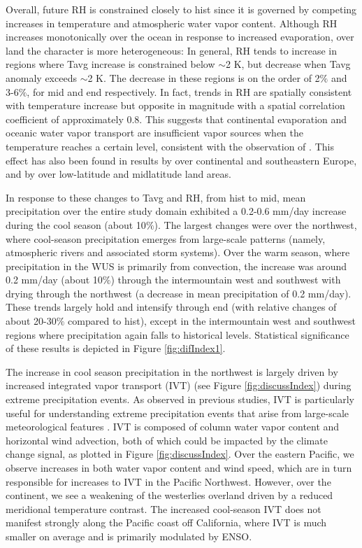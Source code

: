 \documentclass{ametsoc}
\begin{document}
Overall, future RH is constrained closely to {\textsf{hist}} since it is governed by competing increases in temperature and atmospheric water vapor content. Although RH increases monotonically over the ocean in response to increased evaporation, over land the character is more heterogeneous:  In general, RH tends to increase in regions where Tavg increase is constrained below $\sim$2 K, but decrease when Tavg anomaly exceeds $\sim$2 K. The decrease in these regions is on the order of 2$\%$ and 3-6$\%$, for \textsf{mid} and \textsf{end} respectively.  In fact, trends in RH are spatially consistent with temperature increase but opposite in magnitude with a spatial correlation coefficient of approximately 0.8. This suggests that continental evaporation and oceanic water vapor transport are insufficient vapor sources when the temperature reaches a certain level, consistent with the observation of \cite{joshi2008mechanisms}.  This effect has also been found in results by \cite{rowell2006causes} over continental and southeastern Europe, and by \cite{simmons2010low} over low-latitude and midlatitude land areas.


In response to these changes to Tavg and RH, from \textsf{hist} to \textsf{mid}, mean precipitation over the entire study domain exhibited a 0.2-0.6 mm/day increase during the cool season (about 10$\%$). The largest changes were over the northwest, where cool-season precipitation emerges from large-scale patterns (namely, atmospheric rivers and associated storm systems)\citep{trenberth2003changing, neiman2008meteorological}. Over the warm season, where precipitation in the WUS is primarily from convection, the increase was around 0.2 mm/day (about 10$\%$) through the intermountain west and southwest with drying through the northwest (a decrease in mean precipitation of 0.2 mm/day). These trends largely hold and intensify through \textsf{end} (with relative changes of about 20-30$\%$ compared to \textsf{hist}), except in the intermountain west and southwest regions where precipitation again falls to historical levels.  Statistical significance of these results is depicted in Figure \ref{fig:difIndex1}.


The increase in cool season precipitation in the northwest is largely driven by increased integrated vapor transport (IVT) (see Figure \ref{fig:discussIndex}) during extreme precipitation events.  As observed in previous studies, IVT is particularly useful for understanding extreme precipitation events that arise from large-scale meteorological features \citep{ralph2004satellite, leung2009atmospheric, dettinger2011climate}.  IVT is composed of column water vapor content and horizontal wind advection, both of which could be impacted by the climate change signal, as plotted in Figure \ref{fig:discussIndex}. Over the eastern Pacific, we observe increases in both water vapor content and wind speed, which are in turn responsible for increases to IVT in the Pacific Northwest.  However, over the continent, we see a weakening of the westerlies overland driven by a reduced meridional temperature contrast.  The increased cool-season IVT does not manifest strongly along the Pacific coast off California, where IVT is much smaller on average and is primarily modulated by ENSO.
\end{document}
